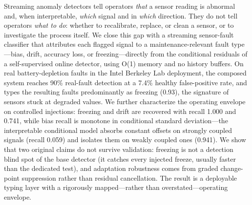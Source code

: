 Streaming anomaly detectors tell operators \emph{that} a sensor reading is abnormal and, when interpretable, \emph{which} signal and in \emph{which} direction. They do not tell operators \emph{what to do}: whether to recalibrate, replace, or clean a sensor, or to investigate the process itself. We close this gap with a streaming sensor-fault classifier that attributes each flagged signal to a maintenance-relevant fault type---bias, drift, accuracy loss, or freezing---directly from the conditional residuals of a self-supervised online detector, using O(1) memory and no history buffers. On real battery-depletion faults in the Intel Berkeley Lab deployment, the composed system reaches 90\% real-fault detection at a 7.4\% healthy false-positive rate, and types the resulting faults predominantly as freezing (0.93), the signature of sensors stuck at degraded values. We further characterize the operating envelope on controlled injections: freezing and drift are recovered with recall 1.000 and 0.741, while bias recall is monotone in conditional standard deviation---the interpretable conditional model absorbs constant offsets on strongly coupled signals (recall 0.059) and isolates them on weakly coupled ones (0.941). We show that two original claims do not survive validation: freezing is not a detection blind spot of the base detector (it catches every injected freeze, usually faster than the dedicated test), and adaptation robustness comes from graded change-point suppression rather than residual cancellation. The result is a deployable typing layer with a rigorously mapped---rather than overstated---operating envelope.
